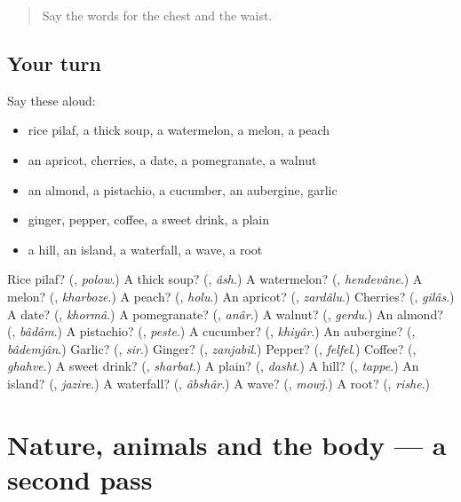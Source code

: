 \begin{quote}
Say the words for the chest and the waist.
\end{quote}

\subsection*{Your turn}
Say these aloud:

\begin{itemize}
\raggedright
  \item rice pilaf, a thick soup, a watermelon, a melon, a peach
  \item an apricot, cherries, a date, a pomegranate, a walnut
  \item an almond, a pistachio, a cucumber, an aubergine, garlic
  \item ginger, pepper, coffee, a sweet drink, a plain
  \item a hill, an island, a waterfall, a wave, a root
\end{itemize}

\begin{tcolorbox}[breakable,colback=teal!4,colframe=teal!35!black,title={Before you move on}]
Rice pilaf? (\textbf{}, \emph{polow}.) A thick soup? (\textbf{}, \emph{âsh}.) A watermelon? (\textbf{}, \emph{hendevâne}.) A melon? (\textbf{}, \emph{kharboze}.) A peach? (\textbf{}, \emph{holu}.) An apricot? (\textbf{}, \emph{zardâlu}.) Cherries? (\textbf{}, \emph{gilâs}.) A date? (\textbf{}, \emph{khormâ}.) A pomegranate? (\textbf{}, \emph{anâr}.) A walnut? (\textbf{}, \emph{gerdu}.) An almond? (\textbf{}, \emph{bâdâm}.) A pistachio? (\textbf{}, \emph{peste}.) A cucumber? (\textbf{}, \emph{khiyâr}.) An aubergine? (\textbf{}, \emph{bâdemjân}.) Garlic? (\textbf{}, \emph{sir}.) Ginger? (\textbf{}, \emph{zanjabil}.) Pepper? (\textbf{}, \emph{felfel}.) Coffee? (\textbf{}, \emph{ghahve}.) A sweet drink? (\textbf{}, \emph{sharbat}.) A plain? (\textbf{}, \emph{dasht}.) A hill? (\textbf{}, \emph{tappe}.) An island? (\textbf{}, \emph{jazire}.) A waterfall? (\textbf{}, \emph{âbshâr}.) A wave? (\textbf{}, \emph{mowj}.) A root? (\textbf{}, \emph{rishe}.)
\end{tcolorbox}
\section[(dialogue)]{Nature, animals and the body — a second pass}

